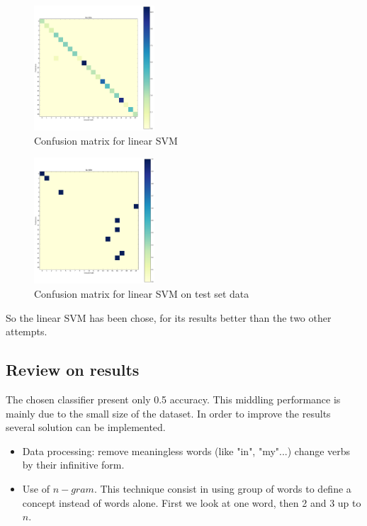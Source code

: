 \begin{multicols}{2}
	\begin{figure}[H]
		\centering
		\includegraphics[width=0.4\textwidth]{classifier_svm_linear}
		\caption{Confusion matrix for linear SVM}
		\label{svm_linear}
	\end{figure}
	\begin{figure}[H]
		\centering
		\includegraphics[width=0.4\textwidth]{classifier_svm_linear_test}
		\caption{Confusion matrix for linear SVM on test set data}
		\label{svm_test}
	\end{figure}
\end{multicols}

So the linear SVM has been chose, for its results better than the two other attempts. 

\subsection{Review on results}

The chosen classifier present only 0.5 accuracy. This middling performance is mainly due to the small size of the dataset. In order to improve the results several solution can be implemented.
\begin{itemize}
	\item Data processing: remove meaningless words (like "in", "my"...) change verbs by their infinitive form.
	\item Use of $n-gram$. This technique consist in using group of words to define a concept instead of words alone. First we look at one word, then 2 and 3 up to $n$.
\end{itemize}

